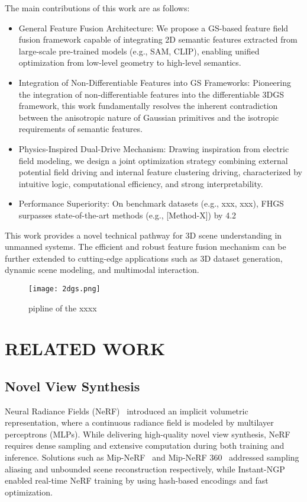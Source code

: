 \documentclass[numbers]{article}
\begin{document}
The main contributions of this work are as follows:
\begin{itemize}
\item General Feature Fusion Architecture: We propose a GS-based feature field fusion framework capable of integrating 2D semantic features extracted from large-scale pre-trained models (e.g., SAM, CLIP), enabling unified optimization from low-level geometry to high-level semantics.
\item Integration of Non-Differentiable Features into GS Frameworks: Pioneering the integration of non-differentiable features into the differentiable 3DGS framework, this work fundamentally resolves the inherent contradiction between the anisotropic nature of Gaussian primitives and the isotropic requirements of semantic features.
\item Physics-Inspired Dual-Drive Mechanism: Drawing inspiration from electric field modeling, we design a joint optimization strategy combining external potential field driving and internal feature clustering driving, characterized by intuitive logic, computational efficiency, and strong interpretability.
\item Performance Superiority: On benchmark datasets (e.g., xxx, xxx), FHGS surpasses state-of-the-art methods (e.g., [Method-X]) by 4.2%
\end{itemize}

This work provides a novel technical pathway for 3D scene understanding in unmanned systems.  The efficient and robust feature fusion mechanism can be further extended to cutting-edge applications such as 3D dataset generation, dynamic scene modeling, and multimodal interaction.
\begin{figure}[htbp]
  \centering
  \texttt{[image: 2dgs.png]} %
  \caption{pipline of the xxxx}
  \label{fig:pipeline} %
\end{figure}

\section{RELATED WORK}
\label{sec:related}
\subsection{Novel View Synthesis}
Neural Radiance Fields (NeRF)~\cite{nerf} introduced an implicit volumetric representation, where a continuous radiance field is modeled by multilayer perceptrons (MLPs). While delivering high-quality novel view synthesis, NeRF requires dense sampling and extensive computation during both training and inference. Solutions such as Mip-NeRF~\cite{mipnerf} and Mip-NeRF 360~\cite{mipnerf360} addressed sampling aliasing and unbounded scene reconstruction respectively, while Instant-NGP~\cite{instantngp} enabled real-time NeRF training by using hash-based encodings and fast optimization.
\end{document}
